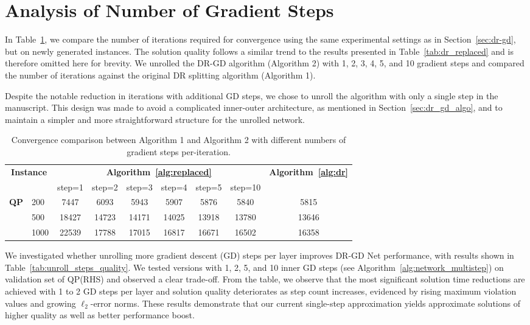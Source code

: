 \documentclass[10pt]{article} %
\begin{document}
\section{Analysis of Number of Gradient Steps}
In Table~\ref{tab:multistep_unroll}, we compare the number of iterations required for convergence using the same experimental settings as in Section~\ref{sec:dr-gd}, but on newly generated instances. The solution quality follows a similar trend to the results presented in Table~\ref{tab:dr_replaced} and is therefore omitted here for brevity.
We unrolled the DR-GD algorithm (Algorithm 2) with 1, 2, 3, 4, 5, and 10 gradient steps and compared the number of iterations against the original DR splitting algorithm (Algorithm 1).

Despite the notable reduction in iterations with additional GD steps, we chose to unroll the algorithm with only a single step in the manuscript. This design was made to avoid a complicated inner-outer architecture, as mentioned in Section~\ref{sec:dr_gd_algo}, and to maintain a simpler and more straightforward structure for the unrolled network.

\begin{table}[h!]
	\centering
        \caption{Convergence comparison between Algorithm 1 and Algorithm 2 with different numbers of gradient steps per-iteration.}
	\label{tab:multistep_unroll}
        \begin{tabular}{@{}ll cccccc c}
	\toprule
        \multicolumn{2}{c}{\multirow{2}{*}{\bf Instance}} & \multicolumn{6}{c}{\bf Algorithm~\ref{alg:replaced}}  &\multirow{2}{*}{\bf Algorithm~\ref{alg:dr}}  \\
        \cmidrule(l){3-8} 
		&& step=1 & step=2 & step=3 & step=4 & step=5& step=10  & \\ 
        \midrule
        \multirow{3}{*}{\textbf{QP}}
        &200&	7447&	6093&	5943&	5907&	5876&	5840&	5815\\
        &500	&18427	&14723	&14171	&14025	&13918	&13780	&13646\\
        &1000	&22539	&17788	&17015	&16817	&16671	&16502&	16358 \\
	\bottomrule
	\end{tabular}
\end{table}

We investigated whether unrolling more gradient descent (GD) steps per layer improves DR-GD Net performance, with results shown in Table~\ref{tab:unroll_steps_quality}. We tested versions with 1, 2, 5, and 10 inner GD steps (see Algorithm~\ref{alg:network_multistep}) on validation set of QP(RHS) and observed a clear trade-off. 
From the table, we observe that the most significant solution time reductions are achieved with 1 to 2 GD steps per layer and solution quality deteriorates as step count increases, evidenced by rising maximum violation values and growing $\ell_2$-error norms.
These results demonstrate that our current single-step approximation yields approximate solutions of higher quality as well as better performance boost.
\end{document}
